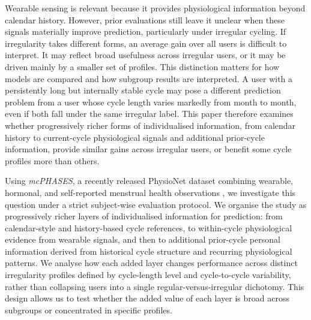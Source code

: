 \documentclass[conference]{IEEEtran}
\begin{document}
Wearable sensing is relevant because it provides physiological information beyond calendar history. However, prior evaluations still leave it unclear when these signals materially improve prediction, particularly under irregular cycling. If irregularity takes different forms, an average gain over all users is difficult to interpret. It may reflect broad usefulness across irregular users, or it may be driven mainly by a smaller set of profiles. This distinction matters for how models are compared and how subgroup results are interpreted. A user with a persistently long but internally stable cycle may pose a different prediction problem from a user whose cycle length varies markedly from month to month, even if both fall under the same irregular label. This paper therefore examines whether progressively richer forms of individualised information, from calendar history to current-cycle physiological signals and additional prior-cycle information, provide similar gains across irregular users, or benefit some cycle profiles more than others.

Using \textit{mcPHASES}, a recently released PhysioNet dataset combining wearable, hormonal, and self-reported menstrual health observations \cite{lin2025mcphases}, we investigate this question under a strict subject-wise evaluation protocol. We organise the study as progressively richer layers of individualised information for prediction: from calendar-style and history-based cycle references, to within-cycle physiological evidence from wearable signals, and then to additional prior-cycle personal information derived from historical cycle structure and recurring physiological patterns. We analyse how each added layer changes performance across distinct irregularity profiles defined by cycle-length level and cycle-to-cycle variability, rather than collapsing users into a single regular-versus-irregular dichotomy. This design allows us to test whether the added value of each layer is broad across subgroups or concentrated in specific profiles.
\end{document}

